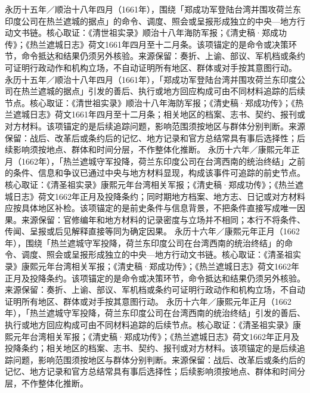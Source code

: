 永历十五年／顺治十八年四月（1661年），围绕「郑成功军登陆台湾并围攻荷兰东印度公司在热兰遮城的据点」的命令、调度、照会或呈报形成独立的中央—地方行动文书链。核心取证：《清世祖实录》顺治十八年海防军报；《清史稿·郑成功传》；《热兰遮城日志》荷文1661年四月至十二月条。该项锚定的是命令或决策环节，命令抵达和结果仍须另外核验。来源保留：奏折、上谕、部议、军机档或条约可证明行政动作和机构立场，不自动证明所有地区、群体或对手按其意图行动。
永历十五年／顺治十八年四月（1661年），「郑成功军登陆台湾并围攻荷兰东印度公司在热兰遮城的据点」引发的善后、执行或地方回应构成可由不同材料追踪的后续节点。核心取证：《清世祖实录》顺治十八年海防军报；《清史稿·郑成功传》；《热兰遮城日志》荷文1661年四月至十二月条；相关地区的档案、志书、契约、报刊或对方材料。该项锚定的是后续追踪问题，影响范围须按地区与群体分别判断。来源保留：战后、改革后或条约后的记忆、地方记录和官方总结常具有事后选择性；后续影响须按地点、群体和时间分层，不作整体化推断。
永历十六年／康熙元年正月（1662年），「热兰遮城守军投降，荷兰东印度公司在台湾西南的统治终结」之前的条件、信息和争议已通过中央与地方材料显现，构成该事件可追踪的前史节点。核心取证：《清圣祖实录》康熙元年台湾相关军报；《清史稿·郑成功传》；《热兰遮城日志》荷文1662年正月及投降条约；同时期地方档案、地方志、日记或对方材料应按具体地区补检。该项锚定的是前史条件与信息背景，不把条件直接写成唯一因果。来源保留：官修编年和地方材料的记录密度与立场并不相同；本行不将条件、传闻、呈报或后见解释直接等同为确定因果。
永历十六年／康熙元年正月（1662年），围绕「热兰遮城守军投降，荷兰东印度公司在台湾西南的统治终结」的命令、调度、照会或呈报形成独立的中央—地方行动文书链。核心取证：《清圣祖实录》康熙元年台湾相关军报；《清史稿·郑成功传》；《热兰遮城日志》荷文1662年正月及投降条约。该项锚定的是命令或决策环节，命令抵达和结果仍须另外核验。来源保留：奏折、上谕、部议、军机档或条约可证明行政动作和机构立场，不自动证明所有地区、群体或对手按其意图行动。
永历十六年／康熙元年正月（1662年），「热兰遮城守军投降，荷兰东印度公司在台湾西南的统治终结」引发的善后、执行或地方回应构成可由不同材料追踪的后续节点。核心取证：《清圣祖实录》康熙元年台湾相关军报；《清史稿·郑成功传》；《热兰遮城日志》荷文1662年正月及投降条约；相关地区的档案、志书、契约、报刊或对方材料。该项锚定的是后续追踪问题，影响范围须按地区与群体分别判断。来源保留：战后、改革后或条约后的记忆、地方记录和官方总结常具有事后选择性；后续影响须按地点、群体和时间分层，不作整体化推断。
